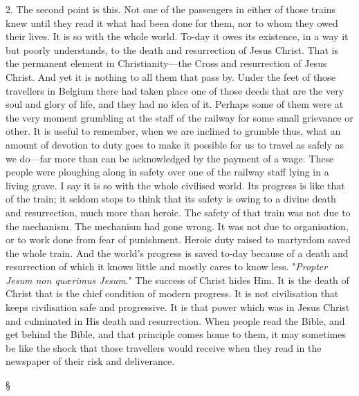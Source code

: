 \documentclass[12pt,a5paper,twoside,titlepage]{book}
\begin{document}
2. The second point is this. Not one of the 
passengers in either of those trains knew until 
they read it what had been done for them, nor 
to whom they owed their lives. It is so with 
the whole world. To-day it owes its existence, 
in a way it but poorly understands, to the 
death and resurrection of Jesus Christ. That 
is the permanent element in Christianity---the 
Cross and resurrection of Jesus Christ. And 
yet it is nothing to all them that pass by. 
Under the feet of those travellers in Belgium 
there had taken place one of those deeds that 
are the very soul and glory of life, and they had 
no idea of it. Perhaps some of them were at 
the very moment grumbling at the staff of the 
railway for some small grievance or other. It 
is useful to remember, when we are inclined to 
grumble thus, what an amount of devotion to 
duty goes to make it possible for us to travel as 
safely as we do---far more than can be acknowledged 
by the payment of a wage. These 
people were ploughing along in safety over one 
of the railway staff lying in a living grave. I 
say it is so with the whole civilised world. Its 
progress is like that of the train; it seldom 
stops to think that its safety is owing to a 
divine death and resurrection, much more than 
heroic. The safety of that train was not due 
to the mechanism. The mechanism had gone 
wrong. It was not due to organisation, or to 
work done from fear of punishment. Heroic 
duty raised to martyrdom saved the whole 
train. And the world's progress is saved to-day 
because of a death and resurrection of which
it knows little and mostly cares to know less. 
"\textit{Propter Jesum non qu{\ae}rimus Jesum}." The 
success of Christ hides Him. It is the death 
of Christ that is the chief condition of modern 
progress. It is not civilisation that keeps 
civilisation safe and progressive. It is that 
power which was in Jesus Christ and culminated 
in His death and resurrection. When 
people read the Bible, and get behind the 
Bible, and that principle comes home to them, 
it may sometimes be like the shock that those 
travellers would receive when they read in the 
newspaper of their risk and deliverance. 

\begin{center} \S \end{center}
\end{document}
